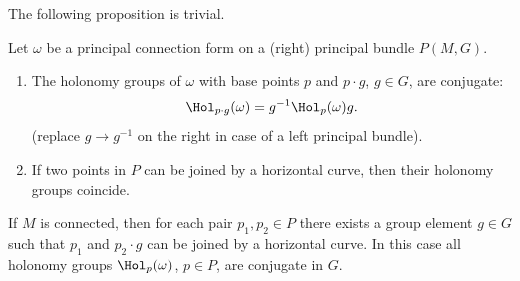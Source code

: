The following proposition is trivial.
\begin{prop}[{{\cite[Prop.~1.7.8]{RS2}}}]\label{prop 1.7.8 RS2}
    Let $\omega$ be a principal connection form on a (right) principal bundle $P(M,G)$. 
    \begin{enumerate}
        \item The holonomy groups of $\omega$ with base points $p$ and $p\cdot g$, $g\in G$, are conjugate:
        \[\Hol_{p\cdot g}(\omega)=g^{-1}\Hol_{p}(\omega)g.\]
        (replace $g\to g^{-1}$ on the right in case of a left principal bundle).

        \item If two points in $P$ can be joined by a horizontal curve, then their holonomy groups coincide.
    \end{enumerate}
\end{prop}


If $M$ is connected, then for each pair $p_1,p_2\in P$ there exists a group element $g\in G$ such that $p_1$ and $p_2\cdot g$ can be joined by a horizontal curve. In this case all holonomy groups $\Hol_p(\omega)$, $p\in P$, are conjugate in $G$.

